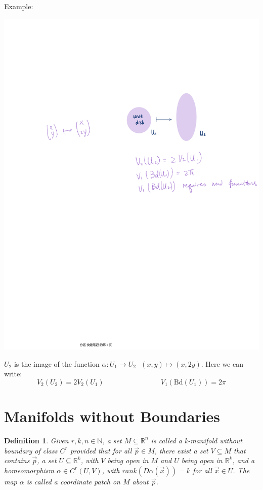 \documentclass[15pt]{book}
\theoremstyle{break}
\theoremstyle{break}
\newtheorem{defn}{Definition}[corL]
\newcommand{\R}{\mathbb{R}}
\newcommand{\N}{\mathbb{N}}
\newcommand{\Bd}{\text{Bd}}
\newcommand{\example}{\color{green}Example: \color{black}}
\begin{document}
\example 
\begin{center}
\includegraphics[scale=0.8]{manifold-disk.pdf}
\end{center}
$U_2$ is the image of the function $\alpha:U_1 \to U_2 \ \ \ (x,y) \mapsto (x,2y)$. Here we can write:
$$V_2(U_2)= 2V_2(U_1) \qquad \qquad \qquad \qquad V_1(\Bd(U_1)) = 2\pi$$
\hfill\break



\newpage
\section[Manifolds without Boundaries]{\color{red}Manifolds without Boundaries\color{black}}
\begin{defn}
Given $r,k,n \in \N$, a set $M \subseteq \R^n$ is called a k-manifold without boundary of class $C^r$ provided that for all $\vec{p} \in M$, there exist a set $V \subseteq M$ that contains $\vec{p}$, a set $U\subseteq \R^k$, with $V$ being open in $M$ and $U$ being open in $\R^k$, and a homeomorphism $\alpha \in C^r(U,V)$, with $rank(D\alpha(\vec{x})) = k$ for all $\vec{x}\in U$. The map $\alpha$ is called a coordinate patch on $M$ about $\vec{p}$.
\end{defn}
\end{document}
